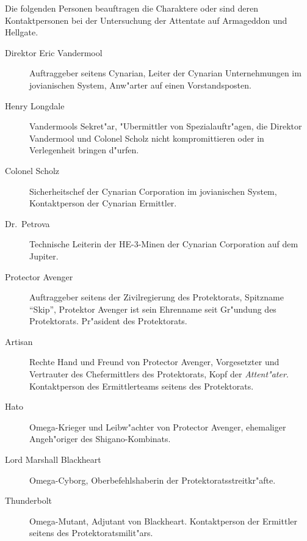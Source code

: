 
Die folgenden Personen beauftragen die Charaktere oder sind deren Kontaktpersonen bei der Untersuchung der Attentate auf Armageddon und Hellgate.


\begin{description}
    \item [Direktor Eric Vandermool] Auftraggeber seitens Cynarian, Leiter der Cynarian Unternehmungen im jovianischen System, Anw"arter auf 
        einen Vorstandsposten.
    \item [Henry Longdale] Vandermools Sekret"ar, "Ubermittler von Spezialauftr"agen, die Direktor Vandermool und Colonel Scholz nicht 
        kompromittieren oder in Verlegenheit bringen d"urfen.
    \item [Colonel Scholz] Sicherheitschef der Cynarian Corporation im jovianischen System, Kontaktperson der Cynarian Ermittler.
    \item [Dr.~Petrova] Technische Leiterin der HE-3-Minen der Cynarian Corporation auf dem Jupiter.
\end{description}


\begin{description}
    \item [Protector Avenger] Auftraggeber seitens der Zivilregierung des Protektorats, Spitzname ``Skip'', Protektor Avenger ist sein 
        Ehrenname seit Gr"undung des Protektorats. Pr"asident des Protektorats.
    \item [Artisan] Rechte Hand und Freund von Protector Avenger, Vorgesetzter und Vertrauter des Chefermittlers des Protektorats, Kopf der 
        \emph{Attent"ater}. Kontaktperson des Ermittlerteams seitens des Protektorats.
    \item [Hato] Omega-Krieger und Leibw"achter von Protector Avenger, ehemaliger Angeh"origer des Shigano-Kombinats.
    \item [Lord Marshall Blackheart] Omega-Cyborg, Oberbefehlshaberin der Protektoratsstreitkr"afte.
    \item [Thunderbolt] Omega-Mutant, Adjutant von Blackheart. Kontaktperson der Ermittler seitens des Protektoratsmilit"ars.
\end{description}
